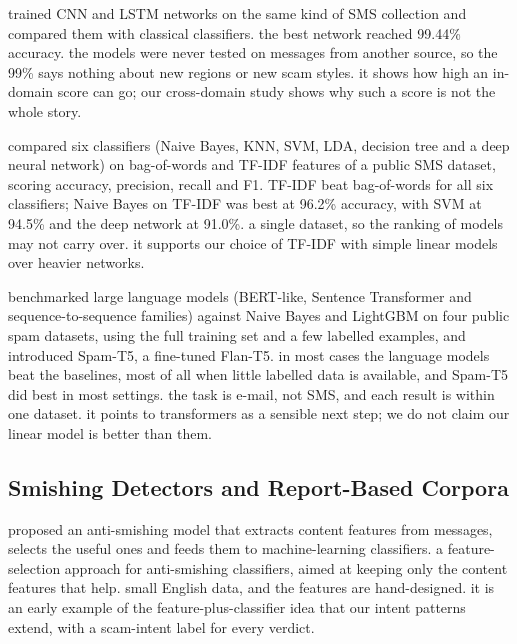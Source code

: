   trained CNN and LSTM networks on the same kind of SMS collection and compared them with classical classifiers.  the best network reached 99.44\% accuracy.  the models were never tested on messages from another source, so the 99\% says nothing about new regions or new scam styles.  it shows how high an in-domain score can go; our cross-domain study shows why such a score is not the whole story.

  compared six classifiers (Naive Bayes, KNN, SVM, LDA, decision tree and a deep neural network) on bag-of-words and TF-IDF features of a public SMS dataset, scoring accuracy, precision, recall and F1.  TF-IDF beat bag-of-words for all six classifiers; Naive Bayes on TF-IDF was best at 96.2\% accuracy, with SVM at 94.5\% and the deep network at 91.0\%.  a single dataset, so the ranking of models may not carry over.  it supports our choice of TF-IDF with simple linear models over heavier networks.

  benchmarked large language models (BERT-like, Sentence Transformer and sequence-to-\allowbreak sequence families) against Naive Bayes and LightGBM on four public spam datasets, using the full training set and a few labelled examples, and introduced Spam-T5, a fine-tuned Flan-T5.  in most cases the language models beat the baselines, most of all when little labelled data is available, and Spam-T5 did best in most settings.  the task is e-mail, not SMS, and each result is within one dataset.  it points to transformers as a sensible next step; we do not claim our linear model is better than them.

\subsection{Smishing Detectors and Report-Based Corpora}

  proposed an anti-smishing model that extracts content features from messages, selects the useful ones and feeds them to machine-learning classifiers.  a feature-selection approach for anti-smishing classifiers, aimed at keeping only the content features that help.  small English data, and the features are hand-designed.  it is an early example of the feature-plus-classifier idea that our intent patterns extend, with a scam-intent label for every verdict.

